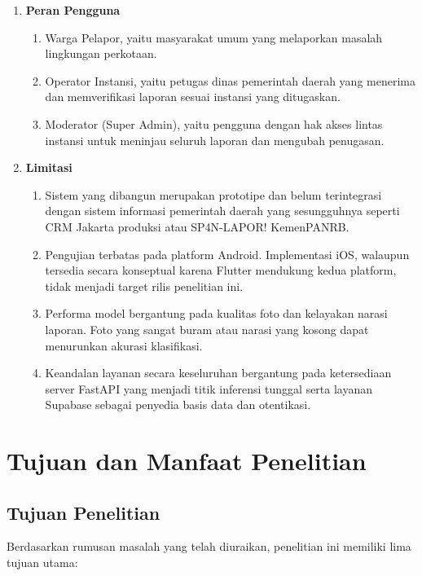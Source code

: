 \begin{enumerate}
    \item \textbf{Peran Pengguna}
    \begin{enumerate}
        \item Warga Pelapor, yaitu masyarakat umum yang melaporkan masalah lingkungan perkotaan.
        \item Operator Instansi, yaitu petugas dinas pemerintah daerah yang menerima dan memverifikasi laporan sesuai instansi yang ditugaskan.
        \item Moderator (Super Admin), yaitu pengguna dengan hak akses lintas instansi untuk meninjau seluruh laporan dan mengubah penugasan.
    \end{enumerate}

    \item \textbf{Limitasi}
    \begin{enumerate}
        \item Sistem yang dibangun merupakan prototipe dan belum terintegrasi dengan sistem informasi pemerintah daerah yang sesungguhnya seperti CRM Jakarta produksi atau SP4N-LAPOR! KemenPANRB.
        \item Pengujian terbatas pada platform Android. Implementasi iOS, walaupun tersedia secara konseptual karena Flutter mendukung kedua platform, tidak menjadi target rilis penelitian ini.
        \item Performa model bergantung pada kualitas foto dan kelayakan narasi laporan. Foto yang sangat buram atau narasi yang kosong dapat menurunkan akurasi klasifikasi.
        \item Keandalan layanan secara keseluruhan bergantung pada ketersediaan server FastAPI yang menjadi titik inferensi tunggal serta layanan Supabase sebagai penyedia basis data dan otentikasi.
    \end{enumerate}
\end{enumerate}

\section{Tujuan dan Manfaat Penelitian}

\subsection{Tujuan Penelitian}

Berdasarkan rumusan masalah yang telah diuraikan, penelitian ini memiliki lima tujuan utama:

